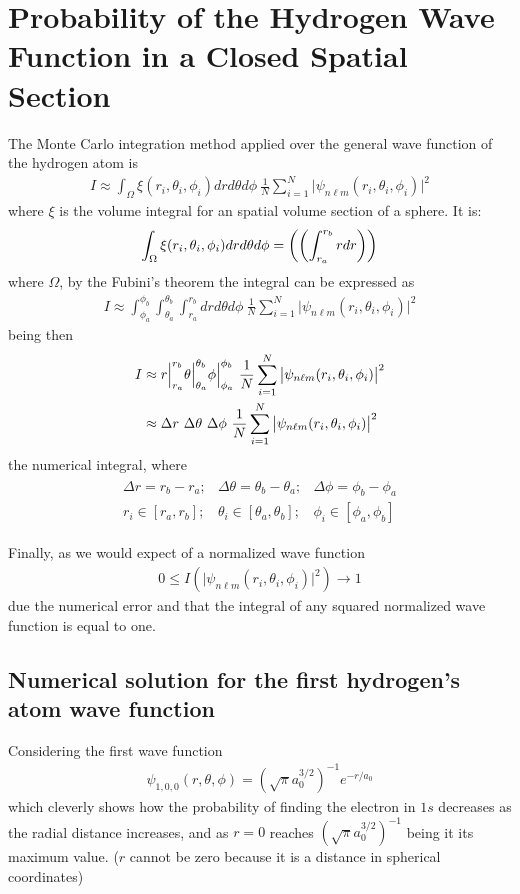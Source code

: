 \documentclass{aa}%
\begin{document}
\section{Probability of the Hydrogen Wave Function in a Closed Spatial Section}
The Monte Carlo integration method applied over the general wave function of the hydrogen atom is
\begin{gather}
	I \approx \int_{\Omega} \xi(r_i,\theta_i,\phi_i) dr d\theta d\phi ~ \frac{1}{N} \sum_{i=1}^{N} \big|\psi_{n\ell m}(r_i,\theta_i,\phi_i)\big|^2
\end{gather}
where $\xi$ is the volume integral for an spatial volume section of a sphere. It is:
\begin{gather}
	\int_{\Omega} \xi(r_i,\theta_i,\phi_i) dr d\theta d\phi = \left(  \left( \int_{r_a}^{r_b} r dr \right) \right)
\end{gather}
where $\Omega$, by the Fubini's theorem the integral can be expressed as
\begin{gather}
	I \approx \int_{\phi_a}^{\phi_b}\int_{\theta_a}^{\theta_b}\int_{r_a}^{r_b} dr d\theta d\phi ~ \frac{1}{N} \sum_{i=1}^{N} \big|\psi_{n\ell m}(r_i,\theta_i,\phi_i)\big|^2
\end{gather}
being then
\begin{align}
	I &\approx r \Big|_{r_a}^{r_b} \theta \Big|_{\theta_a}^{\theta_b} \phi \Big|_{\phi_a}^{\phi_b} ~ \frac{1}{N} \sum_{i=1}^{N} \big|\psi_{n\ell m}(r_i,\theta_i,\phi_i)\big|^2\\
	&\approx \Delta r~\Delta\theta~\Delta\phi ~ \frac{1}{N} \sum_{i=1}^{N} \big|\psi_{n\ell m}(r_i,\theta_i,\phi_i)\big|^2
\end{align}
the numerical integral, where
\begin{gather}
	\begin{array}{lll}
	\Delta r=r_b-r_a;&\Delta\theta=\theta_b-\theta_a;&\Delta\phi=\phi_b-\phi_a\\[10pt]
	r_i\in[r_a,r_b];&\theta_i\in[\theta_a,\theta_b];&\phi_i\in[\phi_a,\phi_b]	
	\end{array}
\end{gather}

\noindent Finally, as we would expect of a normalized wave function
\begin{gather}
	0 \leq I\left(\big|\psi_{n\ell m}(r_i,\theta_i,\phi_i)\big|^2\right) \to 1
\end{gather}
due the numerical error and that the integral of any squared normalized wave function is equal to one.

\subsection{Numerical solution for the first hydrogen's atom wave function}
Considering the first wave function
\begin{gather}
	\psi_{1,0,0}(r,\theta,\phi) = \left( \sqrt{\pi}a_0^{3/2} \right)^{-1} e^{-r/a_0}
\end{gather}
which cleverly shows how the probability of finding the electron in $1s$ decreases as the radial distance increases, and as $r=0$ reaches $\left( \sqrt{\pi}a_0^{3/2} \right)^{-1}$ being it its maximum value. ($r$ cannot be zero because it is a distance in spherical coordinates)\\
\end{document}
